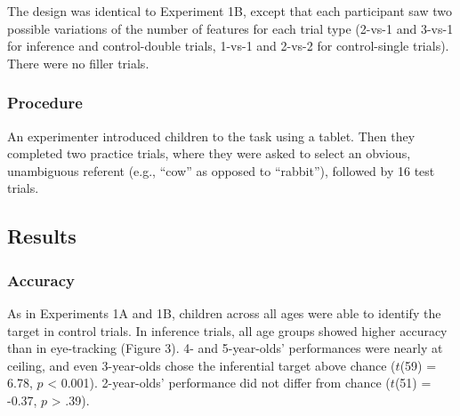 \documentclass[a4paper,man,apacite,floatsintext]{apa6}
\begin{document}
The design was identical to Experiment 1B, except that each participant
saw two possible variations of the number of features for each trial
type (2-vs-1 and 3-vs-1 for inference and control-double trials, 1-vs-1
and 2-vs-2 for control-single trials). There were no filler trials.

\subsubsection{Procedure}\label{procedure-1}

An experimenter introduced children to the task using a tablet. Then
they completed two practice trials, where they were asked to select an
obvious, unambiguous referent (e.g., ``cow'' as opposed to ``rabbit''),
followed by 16 test trials.

\subsection{Results}\label{results-1}

\subsubsection{Accuracy}\label{accuracy-2}

As in Experiments 1A and 1B, children across all ages were able to
identify the target in control trials. In inference trials, all age
groups showed higher accuracy than in eye-tracking (Figure 3). 4- and
5-year-olds' performances were nearly at ceiling, and even 3-year-olds
chose the inferential target above chance (\(t\)(59) = 6.78, \(p\)
\textless{} 0.001). 2-year-olds' performance did not differ from chance
(\(t\)(51) = -0.37, \(p\) \textgreater{} .39).
\end{document}
